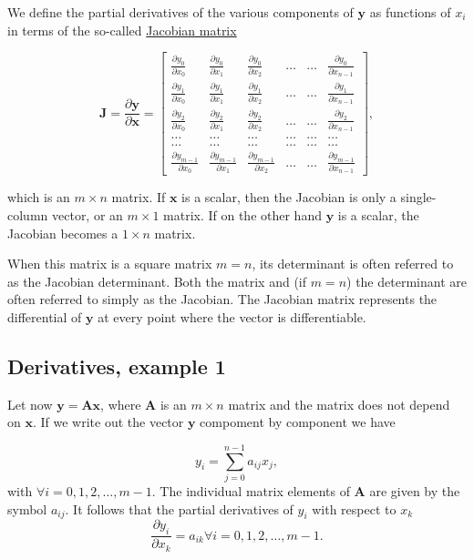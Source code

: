 \documentclass[%
oneside,                 %
final,                   %
10pt]{article}
\begin{document}
We define the partial derivatives of the various components of $\bm{y}$ as functions of $x_i$ in terms of the so-called \href{{https://en.wikipedia.org/wiki/Jacobian_matrix_and_determinant}}{Jacobian matrix}

\[
\bm{J}=\frac{\partial \bm{y}}{\partial \bm{x}}=\begin{bmatrix} \frac{\partial y_0}{\partial x_0} & \frac{\partial y_0}{\partial x_1} & \frac{\partial y_0}{\partial x_2} & \dots & \dots & \frac{\partial y_0}{\partial x_{n-1}} \\ \frac{\partial y_1}{\partial x_0} & \frac{\partial y_1}{\partial x_1} & \frac{\partial y_1}{\partial x_2} & \dots & \dots & \frac{\partial y_1}{\partial x_{n-1}} \\
\frac{\partial y_2}{\partial x_0} & \frac{\partial y_2}{\partial x_1} & \frac{\partial y_2}{\partial x_2} & \dots & \dots & \frac{\partial y_2}{\partial x_{n-1}} \\
\dots & \dots & \dots & \dots & \dots & \dots \\
\dots & \dots & \dots & \dots & \dots & \dots \\
\frac{\partial y_{m-1}}{\partial x_0} & \frac{\partial y_{m-1}}{\partial x_1} & \frac{\partial y_{m-1}}{\partial x_2} & \dots & \dots & \frac{\partial y_{m-1}}{\partial x_{n-1}} \end{bmatrix},
\]

which is an $m\times n$ matrix. If $\bm{x}$ is a scalar, then the
Jacobian is only a single-column vector, or an $m\times 1$ matrix. If
on the other hand $\bm{y}$ is a scalar, the Jacobian becomes a
$1\times n$ matrix.

When this matrix is a square matrix $m=n$, its determinant is often referred to as the Jacobian
determinant. Both the matrix and (if $m=n$) the determinant are
often referred to simply as the Jacobian. The Jacobian matrix represents the differential of $\bm{y}$ at every point where the
vector is differentiable. 

\subsection{Derivatives, example 1}

Let now $\bm{y}=\bm{A}\bm{x}$, where $\bm{A}$ is an $m\times n$ matrix and the matrix does not depend on $\bm{x}$. If we write out the vector $\bm{y}$ compoment by component we have

\[
y_i = \sum_{j=0}^{n-1}a_{ij}x_j,
\]
with $\forall i=0,1,2,\dots,m-1$. The individual matrix elements of $\bm{A}$ are given by the symbol $a_{ij}$.
It follows that the partial derivatives of $y_i$ with respect to $x_k$ 
\[
\frac{\partial y_i }{\partial x_k}= a_{ik} \forall i=0,1,2,\dots,m-1.
\]
\end{document}
